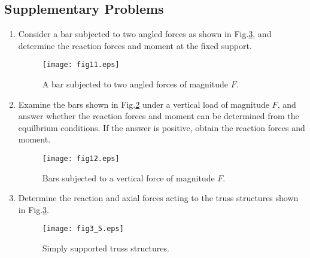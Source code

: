 \documentclass[10pt,a4j]{article}
\begin{document}
\subsection{Supplementary Problems}
\begin{enumerate}
\item
Consider a bar subjected to two angled forces as shown in Fig.\ref{fig:fig3_5}, and 
determine the reaction forces and moment at the fixed support.
\begin{figure}[h]
	\begin{center}
	\texttt{[image: fig11.eps]} 
	\end{center}
	\caption{A bar subjected to two angled forces of magnitude $F$.}
	\label{fig:fig11}
\end{figure}
\item
	Examine the bars shown in Fig.\ref{fig:fig12} under a vertical load 
	of magnitude $F$, and answer whether the reaction forces and 
	moment can be determined from the equilbrium conditions.
	If the answer is positive, obtain the reaction forces and moment. 
\begin{figure}[h]
	\begin{center}
	\texttt{[image: fig12.eps]} 
	\end{center}
	\caption{Bars subjected to a vertical force of magnitude $F$.} 
	\label{fig:fig12}
\end{figure}
\item
Determine the reaction and axial forces acting to the truss structures shown in Fig.\ref{fig:fig3_5}.
\begin{figure}[h]
	\begin{center}
	\texttt{[image: fig3\_5.eps]} 
	\end{center}
	\caption{Simply supported truss structures.} 
	\label{fig:fig3_5}
\end{figure}
\end{enumerate}
\end{document}
